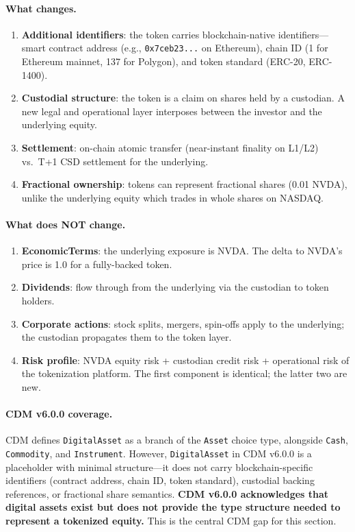 \documentclass[11pt,a4paper]{article}
\begin{document}
\paragraph{What changes.}
\begin{enumerate}[nosep]
\item \textbf{Additional identifiers}: the token carries blockchain-native identifiers---smart contract address (e.g., \texttt{0x7ceb23...} on Ethereum), chain ID (1 for Ethereum mainnet, 137 for Polygon), and token standard (ERC-20, ERC-1400).
\item \textbf{Custodial structure}: the token is a claim on shares held by a custodian. A new legal and operational layer interposes between the investor and the underlying equity.
\item \textbf{Settlement}: on-chain atomic transfer (near-instant finality on L1/L2) vs.\ T+1 CSD settlement for the underlying.
\item \textbf{Fractional ownership}: tokens can represent fractional shares (0.01 NVDA), unlike the underlying equity which trades in whole shares on NASDAQ.
\end{enumerate}

\paragraph{What does NOT change.}
\begin{enumerate}[nosep]
\item \textbf{EconomicTerms}: the underlying exposure is NVDA. The delta to NVDA's price is 1.0 for a fully-backed token.
\item \textbf{Dividends}: flow through from the underlying via the custodian to token holders.
\item \textbf{Corporate actions}: stock splits, mergers, spin-offs apply to the underlying; the custodian propagates them to the token layer.
\item \textbf{Risk profile}: NVDA equity risk + custodian credit risk + operational risk of the tokenization platform. The first component is identical; the latter two are new.
\end{enumerate}

\paragraph{CDM v6.0.0 coverage.} CDM defines \texttt{DigitalAsset} as a branch of the \texttt{Asset} choice type, alongside \texttt{Cash}, \texttt{Commodity}, and \texttt{Instrument}. However, \texttt{DigitalAsset} in CDM v6.0.0 is a placeholder with minimal structure---it does not carry blockchain-specific identifiers (contract address, chain ID, token standard), custodial backing references, or fractional share semantics. \textbf{CDM v6.0.0 acknowledges that digital assets exist but does not provide the type structure needed to represent a tokenized equity.} This is the central CDM gap for this section.
\end{document}
